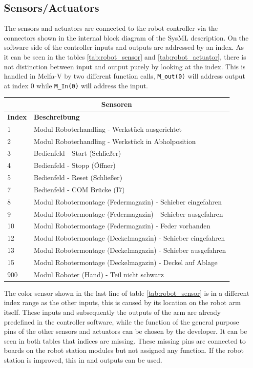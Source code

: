 \documentclass{article}
\begin{document}
\subsection{Sensors/Actuators}
The sensors and actuators are connected to the robot controller via the connectors shown in the internal block diagram of the SysML description. On the software side of the controller inputs and outputs are addressed by an index. As it can be seen in the tables \ref{tab:robot_sensor} and \ref{tab:robot_actuator}, there is not distinction between input and output purely by looking at the index. This is handled in Melfa-V by two different function calls, \texttt{M\_out(0)} will address output at index 0 while \texttt{M\_In(0)} will address the input.
\begin{center}

	\setlength\extrarowheight{4pt}
	\small
	\begin{tabularx}{\textwidth}{|p{1cm}|X|}
		\hline
		\multicolumn{2}{|c|}{\bf \color{black} \large Sensoren}\\
		\hline\hline
		\bf Index & \bf Beschreibung\\
		\hline\hline
		1 & Modul Roboterhandling - Werkstück ausgerichtet\\
		\hline
		2 & Modul Roboterhandling - Werkstück in Abholposition\\
		\hline
		3 & Bedienfeld - Start (Schließer)\\
		\hline
		4 & Bedienfeld - Stopp (Öffner) \\
		\hline
		5 & Bedienfeld - Reset (Schließer)\\
		\hline
		7 & Bedienfeld - COM Brücke (I7)\\
		\hline
		8 & Modul Robotermontage (Federmagazin) - Schieber eingefahren\\
		\hline
		9 & Modul Robotermontage (Federmagazin) - Schieber ausgefahren\\
		\hline
		10 & Modul Robotermontage (Federmagazin) - Feder vorhanden \\
		\hline
		12 & Modul Robotermontage (Deckelmagazin) - Schieber eingefahren\\
		\hline
		13 & Modul Robotermontage (Deckelmagazin) - Schieber ausgefahren\\
		\hline
		15 & Modul Robotermontage (Deckelmagazin) - Deckel auf Ablage\\
		\hline
		900 & Modul Roboter (Hand) - Teil nicht schwarz\\
		\hline
	\end{tabularx}
\label{tab:robot_sensor}
\end{center}
The color sensor shown in the last line of table \ref{tab:robot_sensor} is in a different index range as the other inputs, this is caused by its location on the robot arm itself. These inputs and subsequently the outputs of the arm are already predefined in the controller software, while the function of the general purpose pins of the other sensors and actuators can be chosen by the developer.\newline
It can be seen in both tables that indices are missing. These missing pins are connected to boards on the robot station modules but not assigned any function. If the robot station is improved, this in and outputs can be used.
\end{document}
